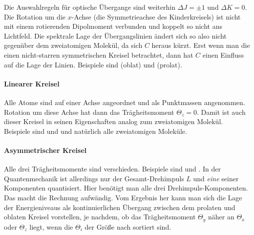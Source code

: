 Die Auswahlregeln für optische Übergange sind weiterhin $\Delta J = \pm 1$ und $\Delta K = 0$. Die Rotation um die $x$-Achse (die Symmetrieachse des Kinderkreisels) ist nicht mit einem rotierenden Dipolmoment verbunden und koppelt so nicht ans Lichtfeld. Die spektrale Lage der Übergangslinien ändert sich so also nicht gegenüber dem zweiatomigen Molekül, da sich $C$ heraus kürzt. Erst wenn man die einen nicht-starren symmetrischen Kreisel betrachtet, dann hat $C$ einen Einfluss auf die Lage der Linien. Beispiele sind   (oblat) und  (prolat).

\begin{marginfigure}
\end{marginfigure}

\paragraph{Linearer Kreisel} Alle Atome sind auf einer Achse angeordnet und als Punktmassen angenommen. Rotation um diese Achse hat dann das Trägheitsmoment $\Theta_z = 0$. Damit ist auch dieser Kreisel in seinen Eigenschaften analog zum zweiatomigen Molekül. Beispiele sind  und  und natürlich alle zweiatomigen Moleküle.
\begin{marginfigure}
\begin{minipage}{30mm}
\centering


\vspace{3mm}

\end{minipage}
\end{marginfigure}

\paragraph{Asymmetrischer Kreisel} Alle drei Trägheitsmomente sind verschieden. Beispiele sind  und . In der Quantenmechanik ist allerdings nur der Gesamt-Drehimpuls $L$ und \emph{eine} seiner Komponenten quantisiert. Hier benötigt man alle drei Drehimpuls-Komponenten. Das macht die Rechnung aufwändig. Vom Ergebnis her kann man sich die Lage der Energieniveaus als kontinuierlichen Übergang zwischen dem prolaten und oblaten Kreisel vorstellen, je nachdem, ob das Trägheitsmoment $\Theta_y$ näher an $\Theta_x$ oder $\Theta_z$ liegt, wenn die $\Theta_i$ der Größe nach sortiert sind.
\begin{marginfigure}
\end{marginfigure}






\printbibliography[segment=\therefsegment,heading=subbibliography]
